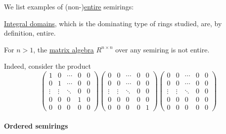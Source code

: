 \begin{example}\label{ex:def:entire_semiring}
  We list examples of (non-)\hyperref[def:entire_semiring]{entire} semirings:
  \begin{thmenum}
     \hyperref[def:integral_domain]{Integral domains}, which is the dominating type of rings studied, are, by definition, entire.

     For \( n > 1 \), the \hyperref[thm:matrix_algebra]{matrix algebra} \( R^{n \times n} \) over any semiring is not entire.

    Indeed, consider the product
    \begin{equation*}
      \begin{pmatrix}
        1      & 0      & \cdots & 0 & 0 \\
        0      & 1      & \cdots & 0 & 0 \\
        \vdots & \vdots & \ddots & 0 & 0 \\
        0      & 0      & 0      & 1 & 0 \\
        0      & 0      & 0      & 0 & 0
      \end{pmatrix}
      \begin{pmatrix}
        0      & 0      & \cdots & 0 & 0 \\
        0      & 0      & \cdots & 0 & 0 \\
        \vdots & \vdots & \ddots & 0 & 0 \\
        0      & 0      & 0      & 0 & 0 \\
        0      & 0      & 0      & 0 & 1
      \end{pmatrix}
      \begin{pmatrix}
        0      & 0      & \cdots & 0 & 0 \\
        0      & 0      & \cdots & 0 & 0 \\
        \vdots & \vdots & \ddots & 0 & 0 \\
        0      & 0      & 0      & 0 & 0 \\
        0      & 0      & 0      & 0 & 0
      \end{pmatrix}
    \end{equation*}
  \end{thmenum}
\end{example}

\paragraph{Ordered semirings}

